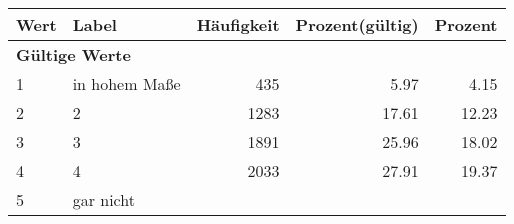      \begin{longtable}{lXrrr}
     \toprule
     \textbf{Wert} & \textbf{Label} & \textbf{Häufigkeit} & \textbf{Prozent(gültig)} & \textbf{Prozent} \\
     \endhead
     \midrule
     \multicolumn{5}{l}{\textbf{Gültige Werte}}\\

     1 &
     \multicolumn{1}{X}{ in hohem Maße   } &


       \num{435} &
       \num[round-mode=places,round-precision=2]{5,97} &
         \num[round-mode=places,round-precision=2]{4,15} \\

     2 &
     \multicolumn{1}{X}{ 2   } &


       \num{1283} &
       \num[round-mode=places,round-precision=2]{17,61} &
         \num[round-mode=places,round-precision=2]{12,23} \\

     3 &
     \multicolumn{1}{X}{ 3   } &


       \num{1891} &
       \num[round-mode=places,round-precision=2]{25,96} &
         \num[round-mode=places,round-precision=2]{18,02} \\

     4 &
     \multicolumn{1}{X}{ 4   } &


       \num{2033} &
       \num[round-mode=places,round-precision=2]{27,91} &
         \num[round-mode=places,round-precision=2]{19,37} \\

     5 &
     \multicolumn{1}{X}{ gar nicht   } &



\end{longtable}
